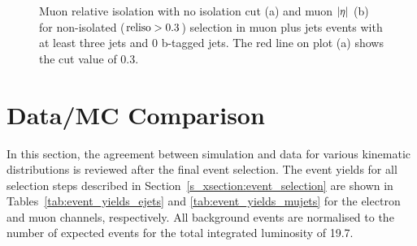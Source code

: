 \begin{figure}[!htbp]
	\centering
	\vspace*{-0.35cm}
  	\hfill
    \caption[Muon relative isolation with no isolation cut and muon $\abs \eta$ for non-isolated selection in muon plus
    jets events]{Muon relative isolation with no isolation cut (a) and muon $\abs \eta$ (b) for non-isolated ($\textrm{reliso} >
    0.3$) selection in muon plus jets events with at least three jets and 0 b-tagged jets. The red line on plot (a)
    shows the \reliso cut value of \num{0.3}.}
    \label{fig:qcd_muon_plots}
\end{figure}

\section{Data/MC Comparison}
\label{s_xsection:data_mc_comparison}

In this section, the agreement between simulation and data for various kinematic distributions is reviewed after the
final event selection. The event yields for all selection steps described in Section~\ref{s_xsection:event_selection}
are shown in Tables~\ref{tab:event_yields_ejets} and \ref{tab:event_yields_mujets} for the electron and muon channels,
respectively. All background events are normalised to the number of expected events for the total integrated luminosity
of \SI{19.7}{\fbinv}.

